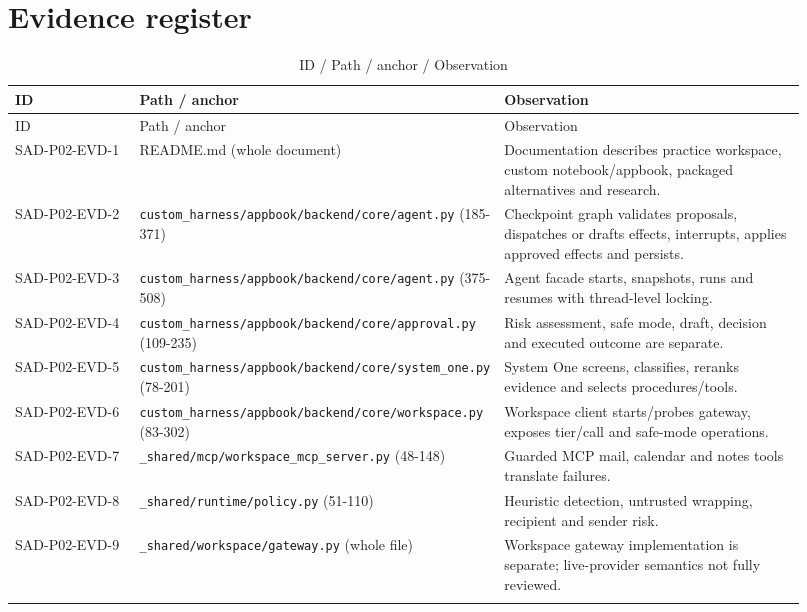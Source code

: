 \documentclass[10pt,letterpaper]{article}
\begin{document}
\section{Evidence register}
\begin{longtable}{@{}>{\raggedright\arraybackslash}p{0.17\linewidth}>{\raggedright\arraybackslash}p{0.34\linewidth}>{\raggedright\arraybackslash}p{0.41\linewidth}@{}}
\caption{ID / Path / anchor / Observation}\\
\toprule ID & Path / anchor & Observation\\\midrule\endfirsthead
\toprule ID & Path / anchor & Observation\\\midrule\endhead
SAD-P02-EVD-1 & README.md (whole document) & Documentation describes practice workspace, custom notebook/appbook, packaged alternatives and research.\\\addlinespace
SAD-P02-EVD-2 & \nolinkurl{custom_harness/appbook/backend/core/agent.py} (185-371) & Checkpoint graph validates proposals, dispatches or drafts effects, interrupts, applies approved effects and persists.\\\addlinespace
SAD-P02-EVD-3 & \nolinkurl{custom_harness/appbook/backend/core/agent.py} (375-508) & Agent facade starts, snapshots, runs and resumes with thread-level locking.\\\addlinespace
SAD-P02-EVD-4 & \nolinkurl{custom_harness/appbook/backend/core/approval.py} (109-235) & Risk assessment, safe mode, draft, decision and executed outcome are separate.\\\addlinespace
SAD-P02-EVD-5 & \nolinkurl{custom_harness/appbook/backend/core/system_one.py} (78-201) & System One screens, classifies, reranks evidence and selects procedures/tools.\\\addlinespace
SAD-P02-EVD-6 & \nolinkurl{custom_harness/appbook/backend/core/workspace.py} (83-302) & Workspace client starts/probes gateway, exposes tier/call and safe-mode operations.\\\addlinespace
SAD-P02-EVD-7 & \nolinkurl{_shared/mcp/workspace_mcp_server.py} (48-148) & Guarded MCP mail, calendar and notes tools translate failures.\\\addlinespace
SAD-P02-EVD-8 & \nolinkurl{_shared/runtime/policy.py} (51-110) & Heuristic detection, untrusted wrapping, recipient and sender risk.\\\addlinespace
SAD-P02-EVD-9 & \nolinkurl{_shared/workspace/gateway.py} (whole file) & Workspace gateway implementation is separate; live-provider semantics not fully reviewed.\\\addlinespace

\end{longtable}
\end{document}
